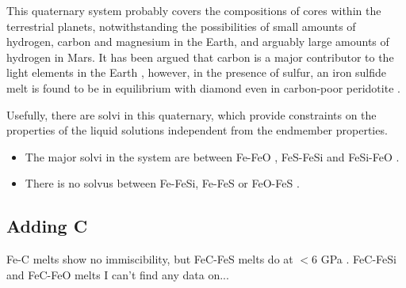 \documentclass[11pt,a4paper,english]{article}
\begin{document}
This quaternary system probably covers the compositions of cores within the terrestrial planets, notwithstanding the possibilities of small amounts of hydrogen, carbon and magnesium in the Earth, and arguably large amounts of hydrogen in Mars. It has been argued that carbon is a major contributor to the light elements in the Earth \citep[e.g.][]{Prescheretal2015}, however, in the presence of sulfur, an iron sulfide melt is found to be in equilibrium with diamond even in carbon-poor peridotite \citep{TD2015}.

Usefully, there are solvi in this quaternary, which provide constraints on the properties of the liquid solutions independent from the endmember properties. 
\begin{itemize}
\item The major solvi in the system are between Fe-FeO \citep{FS1997, HK2004, TOT2007}, FeS-FeSi \citep{Raghavan1988, SF2004,MK2010} and FeSi-FeO \citep{IP1973}.
\item There is no solvus between Fe-FeSi, Fe-FeS \citep{WH1979} or FeO-FeS \citep{WH1979, Kress2000}.
\end{itemize}

\subsection{Adding C}
Fe-C melts show no immiscibility, but FeC-FeS melts do at $<$6 GPa \citep{CWF2008,DBWW2009}.
FeC-FeSi and FeC-FeO melts I can't find any data on...
\clearpage

\end{document}
